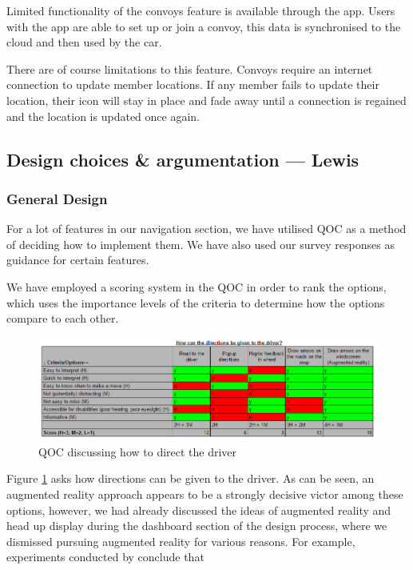 \documentclass{article}
\begin{document}
Limited functionality of the convoys feature is available through the app. Users with the app are able to set up or join a convoy, this data is synchronised to the cloud and then used by the car.

There are of course limitations to this feature. Convoys require an internet connection to update member locations. If any member fails to update their location, their icon will stay in place and fade away until a connection is regained and the location is updated once again.

\subsection{Design choices \& argumentation --- Lewis}\label{ssec:nav-design}
\subsubsection{General Design}\label{sssec:nav-design-general}
For a lot of features in our navigation section, we have utilised QOC as a method of deciding how to implement them. We have also used our survey responses as guidance for certain features.

We have employed a scoring system in the QOC in order to rank the options, which uses the importance levels of the criteria to determine how the options compare to each other.

\begin{figure}[H]
  \centering
  \includegraphics[scale=0.5]{qoc-nav-instruction}
  \caption{QOC discussing how to direct the driver}\label{qoc-instructions}
\end{figure}

Figure \ref{qoc-instructions} asks how directions can be given to the driver. As can be seen, an augmented reality approach appears to be a strongly decisive victor among these options, however, we had already discussed the ideas of augmented reality and head up display during the dashboard section of the design process, where we dismissed pursuing augmented reality for various reasons. For example, experiments conducted by %
conclude that 
\end{document}
